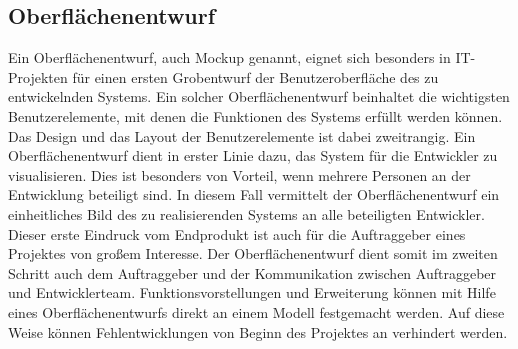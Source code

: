 \subsection{Oberflächenentwurf}
\label{sec:Oberflaechenentwuf}

Ein Oberflächenentwurf, auch Mockup genannt, eignet sich besonders in
IT-Projekten für einen ersten Grobentwurf der Benutzeroberfläche des zu
entwickelnden Systems. Ein solcher Oberflächenentwurf beinhaltet die wichtigsten
Benutzerelemente, mit denen die Funktionen des Systems erfüllt werden können.
Das Design und das Layout der Benutzerelemente ist dabei zweitrangig. Ein
Oberflächenentwurf dient in erster Linie dazu, das System für die Entwickler zu
visualisieren. Dies ist besonders von Vorteil, wenn mehrere Personen an der
Entwicklung beteiligt sind. In diesem Fall vermittelt der Oberflächenentwurf ein
einheitliches Bild des zu realisierenden Systems an alle beteiligten
Entwickler. Dieser erste Eindruck vom Endprodukt ist auch für die Auftraggeber
eines Projektes von großem Interesse. Der Oberflächenentwurf dient somit im
zweiten Schritt auch dem Auftraggeber und der Kommunikation zwischen
Auftraggeber und Entwicklerteam. Funktionsvorstellungen und Erweiterung können
mit Hilfe eines Oberflächenentwurfs direkt an einem Modell festgemacht werden.
Auf diese Weise können Fehlentwicklungen von Beginn des Projektes an verhindert
werden.


